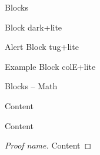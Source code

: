 \documentclass[table,aspectratio=43]{beamer}
\begin{document}
  \begin{frame}{Blocks}
    \begin{block}{Block}
      dark+lite
    \end{block}
    \begin{alertblock}{Alert Block}
      tug+lite
    \end{alertblock}
    \begin{exampleblock}{Example Block}
      colE+lite
    \end{exampleblock}
  \end{frame}

  \begin{frame}{Blocks -- Math}
    \begin{theorem}
      Content
    \end{theorem}
    \begin{example}
      Content
    \end{example}
    \begin{proof}[Proof name]
      Content
    \end{proof}
  \end{frame}
\end{document}
